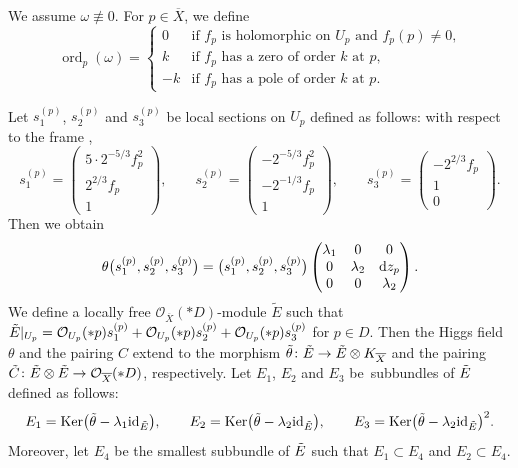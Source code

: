 \documentclass[pdftex]{sigma}
\numberwithin{equation}{section}
\newcommand{\id}{\mathrm{id}}
\newcommand{\Ker}{\operatorname{Ker}}
\newcommand{\ord}{\operatorname{ord}}
\newcommand{\strsheaf}{\mathcal{O}}
\begin{document}
We assume $\omega \not\equiv 0$.
For $p\in \overline{X}$, we define
\begin{equation*}
 \ord_p(\omega) = \begin{cases}
 0 & \text{if $f_p$ is holomorphic on $U_p$ and $f_p(p)\neq 0$,} \\
 k & \text{if $f_p$ has a zero of order $k$ at $p$,} \\
 -k & \text{if $f_p$ has a pole of order $k$ at $p$.}
 \end{cases}
\end{equation*}

Let $s^{(p)}_1$, $s^{(p)}_2$ and $s^{(p)}_3$ be local sections on $U_p$ defined as follows: with respect to the frame ,
\begin{equation}\label{sections}
 s^{(p)}_1 = \begin{pmatrix}
 5\cdot 2^{-5/3}f_p^2 \\
 2^{2/3} f_p \\
 1
 \end{pmatrix},\qquad
 s^{(p)}_2 = \begin{pmatrix}
 -2^{-5/3}f_p^2 \\
 -2^{-1/3} f_p \\
 1
 \end{pmatrix},\qquad
 s^{(p)}_3 = \begin{pmatrix}
 -2^{2/3}f_p \\
 1 \\
 0
 \end{pmatrix}.
\end{equation}
Then we obtain
\begin{equation*}
 \theta\bigl(s_1^{(p)},s_2^{(p)},s_3^{(p)}\bigr) = \bigl(s_1^{(p)},s_2^{(p)},s_3^{(p)}\bigr)\begin{pmatrix}
 \lambda_1 & 0 & 0\\
 0 & \lambda_2 & {\rm d}z_p \\
 0 & 0 & \lambda_2
 \end{pmatrix}.
\end{equation*}
We define a locally free $\strsheaf_{\overline{X}}(*D)$-module $\tilde{E}$ such that $\tilde{E}|_{U_p} = \mathcal{O}_{U_p}(*p)s^{(p)}_1+\mathcal{O}_{U_p}(*p)s^{(p)}_2+\smash{\mathcal{O}_{U_p}(*p)s^{(p)}_3}$ for $p\in D$. Then the Higgs field $\theta$ and the pairing $C$ extend to the morphism $\Tilde{\theta}\colon \Tilde{E}\to\Tilde{E}\otimes K_{\overline{X}}$ and the pairing $\Tilde{C}\colon \Tilde{E}\otimes \Tilde{E}\to \strsheaf_{\overline{X}}(*D)$, respectively. Let $E_1$, $E_2$ and $E_3$ be~subbundles of $\Tilde{E}$ defined as follows:
\begin{equation*}
 E_1 = \Ker\bigl(\Tilde{\theta} -\lambda_1 \id_{\Tilde{E}}\bigr), \qquad E_2 = \Ker\bigl(\Tilde{\theta} -\lambda_2 \id_{\Tilde{E}}\bigr), \qquad E_3 = \Ker\bigl(\Tilde{\theta} - \lambda_2 \id_{\Tilde{E}}\bigr)^2.
\end{equation*}
Moreover, let $E_4$ be the smallest subbundle of $\Tilde{E}$ such that $E_1\subset E_4$ and $E_2\subset E_4$.
\end{document}
